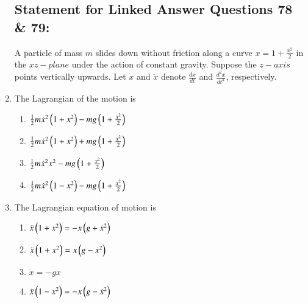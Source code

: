 \documentclass[journal]{IEEEtran}
\begin{document}
\begin{enumerate}
\subsection*{Statement for Linked Answer Questions 78 \& 79:}
A particle of mass $m$ slides down without friction along a curve $x = 1 + \frac{x^2}{2}$ in the $xz-plane$ under the action of constant gravity. Suppose the $z-axis$ points vertically upwards. Let $\dot{x}$ and $\ddot{x}$ denote $\frac{dx}{dt}$ and $\frac{d^2x}{dt^2}$, respectively.
\item The Lagrangian of the motion is
\begin{multicols}{2}
    \begin{enumerate}
        \item $\frac{1}{2} m\dot{x}^2\left(1+x^2\right) - mg\left(1+\frac{x^2}{2}\right)$
        \item $\frac{1}{2} m\dot{x}^2\left(1+x^2\right) + mg\left(1+\frac{x^2}{2}\right)$
        \item $\frac{1}{2} m\dot{x}^2 x^2 - mg\left(1+\frac{x^2}{2}\right)$
        \item $\frac{1}{2} m\dot{x}^2\left(1-x^2\right) - mg\left(1+\frac{x^2}{2}\right)$
    \end{enumerate}
\end{multicols}
\item The Lagrangian equation of motion is
\begin{multicols}{2}
    \begin{enumerate}
        \item $\ddot{x} \left(1+x^2\right) = -x\left(g+\dot{x}^2\right)$
        \item $\ddot{x} \left(1+x^2\right) = x\left(g-\dot{x}^2\right)$
        \item $\ddot{x} = - gx$
        \item $\ddot{x} \left(1-x^2\right) = -x \left(g-\dot{x}^2\right)$
    \end{enumerate}
\end{multicols}


\end{enumerate}
\end{document}
